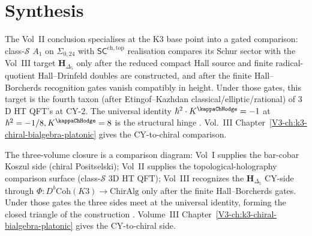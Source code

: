 \section{Synthesis}
\label{sec:concl-supplement}

\begin{remark}
\label{rem:concl-1}
The Vol~II conclusion specialises at the K3 base point into a gated
comparison: class-$\mathcal S$ $A_1$ on $\Sigma_{0,24}$ with
$\mathsf{SC}^{\mathrm{ch,top}}$ realisation compares its Schur sector
with the Vol~III target $\mathbf H_{\Delta_5}$ only after the reduced
compact Hall source and finite radical-quotient Hall--Drinfeld doubles
are constructed, and after the finite Hall--Borcherds recognition gates
vanish compatibly in height. Under those
gates, this target is the fourth taxon (after Etingof--Kazhdan
classical/elliptic/rational) of $3$D HT QFT's at CY-$2$. The universal identity
$\hbar^2\cdot K^{\kappaChHodge} = -1$ at
$\hbar^2 = -1/8, K^{\kappaChHodge} = 8$
is the structural hinge \cite{Gaiotto2009,EtingofKazhdan2007PartV}.
Vol.~III Chapter~\ref{V3-ch:k3-chiral-bialgebra-platonic} gives the
CY-to-chiral comparison.
\end{remark}

\begin{remark}
\label{rem:concl-2}
The three-volume closure is a comparison diagram: Vol~I supplies the
bar-cobar Koszul side (chiral Positselski); Vol~II supplies the
topological-holography comparison surface (class-$\mathcal S$ $3$D HT
QFT); Vol~III recognizes the $\mathbf H_{\Delta_5}$ CY-side through
$\Phi:D^b\mathrm{Coh}(K3)\to \mathrm{ChirAlg}$ only after the finite
Hall--Borcherds gates. Under those gates the three sides meet at the
universal identity, forming the closed triangle of the construction
\cite{Mukai1987,Borcherds1992,GritsenkoNikulin1998}. Volume~III
Chapter~\ref{V3-ch:k3-chiral-bialgebra-platonic} gives the
CY-to-chiral side.
\end{remark}
